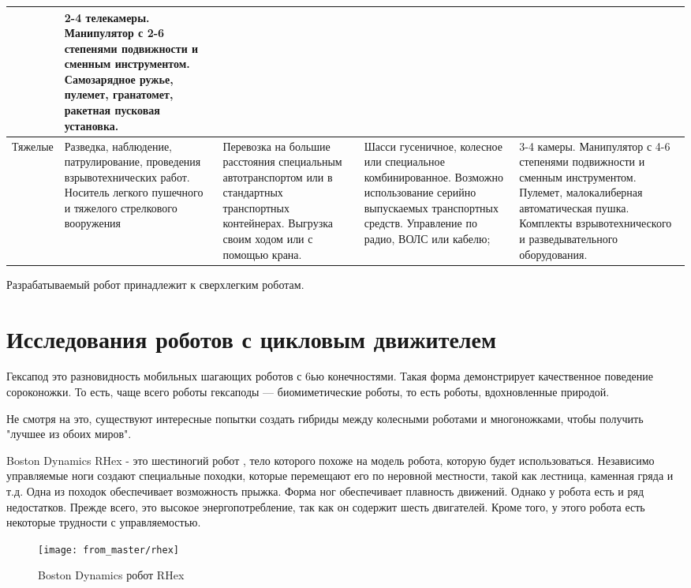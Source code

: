 \begin{longtable}[H]{|p{2cm}|p{3cm}|p{3cm}|p{3.2cm}|p{3cm}|}
&
2-4 телекамеры. Манипулятор с 2-6 степенями подвижности и сменным инструментом. Самозарядное ружье, пулемет, гранатомет, ракетная пусковая установка. \\ 
\hline 
\normalsize{Тяжелые}
&
Разведка, наблюдение, патрулирование, проведения взрывотехнических работ. Носитель легкого пушечного и тяжелого стрелкового вооружения
&
Перевозка на большие расстояния специальным автотранспортом или в стандартных транспортных контейнерах. Выгрузка своим ходом или с помощью крана.
&
Шасси гусеничное, колесное или специальное комбинированное. Возможно использование серийно выпускаемых транспортных средств. Управление по радио, ВОЛС или кабелю;  
&
3-4 камеры. Манипулятор с 4-6 степенями подвижности и сменным инструментом. Пулемет, малокалиберная автоматическая пушка. Комплекты взрывотехнического и разведывательного оборудования. \\  
\hline 
\end{longtable}

Разрабатываемый робот принадлежит к сверхлегким роботам.

\section{Исследования роботов с цикловым движителем}
Гексапод это разновидность мобильных шагающих роботов с 6ью конечностями. Такая форма демонстрирует качественное поведение сороконожки. То есть, чаще всего роботы гексаподы --- биомиметические роботы, то есть роботы, вдохновленные природой.

Не смотря на это, существуют интересные попытки создать гибриды между колесными роботами и многоножками, чтобы получить "лучшее из обоих миров".

Boston Dynamics RHex \cite{Altendorfer2001} - это шестиногий робот , тело которого похоже на модель робота, которую будет использоваться. Независимо управляемые ноги создают специальные походки, которые перемещают его по неровной местности, такой как лестница, каменная гряда и т.д. Одна из походок обеспечивает возможность прыжка. Форма ног обеспечивает плавность движений. Однако у робота есть и ряд недостатков. Прежде всего, это высокое энергопотребление, так как он содержит шесть двигателей. Кроме того, у этого робота есть некоторые трудности с управляемостью. 

\begin{figure}[H]
    \centering\texttt{[image: from\_master/rhex]}\\
    \caption{Boston Dynamics робот RHex}
    \label{fig:rhex}
    \end{figure}

